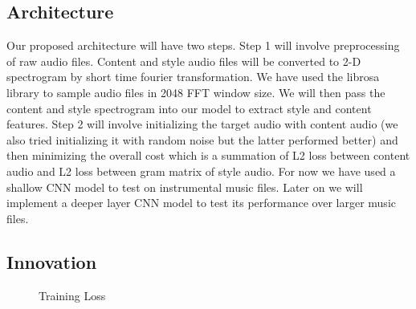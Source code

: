 \documentclass[10pt,twocolumn,letterpaper]{article}
\begin{document}
\subsection{Architecture}
Our proposed architecture will have two steps. Step 1 will involve preprocessing of raw audio files. Content and style audio files will be converted to 2-D spectrogram by short time fourier transformation. We have used the librosa library to sample audio files in 2048 FFT window size.
We will then pass the content and style spectrogram into our model to extract style and content features. Step 2 will involve initializing the target audio with content audio (we also tried initializing it with random noise but the latter performed better) and then minimizing the overall cost which is a summation of L2 loss between content audio and L2 loss between gram matrix of style audio. For now we have used a shallow CNN model to test on instrumental music files. Later on we will implement a deeper layer CNN model to test its performance over larger music files.

\subsection{Innovation}


\begin{figure}
\begin{center}
\end{center}
   \caption{Training Loss}
\label{fig:short}
\end{figure}
\end{document}
